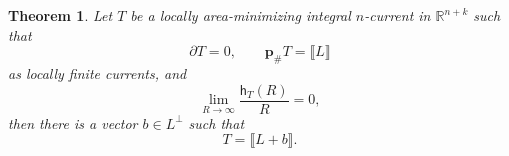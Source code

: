 \documentclass[11pt,reqno]{amsart}
\numberwithin{equation}{section}
\newtheorem{theorem}{Theorem}[section]
\theoremstyle{definition}
\theoremstyle{remark}
\begin{document}
\begin{theorem}
\label{thm:degree-one-bernstein}
Let $T$ be a locally area-minimizing integral $n$-current in
$\mathbb R^{n+k}$ such that
\begin{equation}
  \partial T=0,
  \qquad
  \mathbf p_\#T=\llbracket L\rrbracket
  \label{eq:bernstein-hypotheses}
\end{equation}
as locally finite currents, and
\begin{equation}
  \lim_{R\to\infty}\frac{\mathsf h_T(R)}{R}=0,
  \label{eq:bernstein-sublinear-height}
\end{equation}
then there is a vector $b\in L^\perp$ such that
\begin{equation}
  T=\llbracket L+b\rrbracket.
  \label{eq:bernstein-conclusion}
\end{equation}
\end{theorem}
\end{document}
